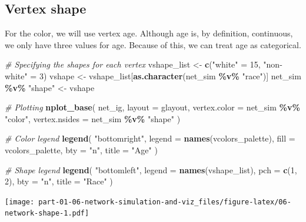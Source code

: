 \documentclass[
]{book}
\newenvironment{Shaded}{\begin{snugshade}}{\end{snugshade}}
\newcommand{\AttributeTok}[1]{\textcolor[rgb]{0.13,0.29,0.53}{#1}}
\newcommand{\CommentTok}[1]{\textcolor[rgb]{0.56,0.35,0.01}{\textit{#1}}}
\newcommand{\DecValTok}[1]{\textcolor[rgb]{0.00,0.00,0.81}{#1}}
\newcommand{\FunctionTok}[1]{\textcolor[rgb]{0.13,0.29,0.53}{\textbf{#1}}}
\newcommand{\NormalTok}[1]{#1}
\newcommand{\OtherTok}[1]{\textcolor[rgb]{0.56,0.35,0.01}{#1}}
\newcommand{\SpecialCharTok}[1]{\textcolor[rgb]{0.81,0.36,0.00}{\textbf{#1}}}
\newcommand{\StringTok}[1]{\textcolor[rgb]{0.31,0.60,0.02}{#1}}
\begin{document}
\hypertarget{vertex-shape}{%
\subsection{Vertex shape}\label{vertex-shape}}

For the color, we will use vertex age. Although age is, by definition, continuous,
we only have three values for age. Because of this, we can treat age as categorical.

\begin{Shaded}
\begin{Highlighting}[]
\CommentTok{\# Specifying the shapes for each vertex}
\NormalTok{vshape\_list }\OtherTok{\textless{}{-}} \FunctionTok{c}\NormalTok{(}\StringTok{"white"} \OtherTok{=} \DecValTok{15}\NormalTok{, }\StringTok{"non{-}white"} \OtherTok{=} \DecValTok{3}\NormalTok{)}
\NormalTok{vshape      }\OtherTok{\textless{}{-}}\NormalTok{ vshape\_list[}\FunctionTok{as.character}\NormalTok{(net\_sim }\SpecialCharTok{\%v\%} \StringTok{"race"}\NormalTok{)]}
\NormalTok{net\_sim }\SpecialCharTok{\%v\%} \StringTok{"shape"} \OtherTok{\textless{}{-}}\NormalTok{ vshape}

\CommentTok{\# Plotting}
\FunctionTok{nplot\_base}\NormalTok{(}
\NormalTok{  net\_ig,}
  \AttributeTok{layout =}\NormalTok{ glayout,}
  \AttributeTok{vertex.color =}\NormalTok{ net\_sim }\SpecialCharTok{\%v\%} \StringTok{"color"}\NormalTok{,}
  \AttributeTok{vertex.nsides =}\NormalTok{ net\_sim }\SpecialCharTok{\%v\%} \StringTok{"shape"}
\NormalTok{  )}

\CommentTok{\# Color legend}
\FunctionTok{legend}\NormalTok{(}
  \StringTok{"bottomright"}\NormalTok{,}
  \AttributeTok{legend =} \FunctionTok{names}\NormalTok{(vcolors\_palette),}
  \AttributeTok{fill   =}\NormalTok{ vcolors\_palette, }
  \AttributeTok{bty    =} \StringTok{"n"}\NormalTok{,}
  \AttributeTok{title  =} \StringTok{"Age"}
\NormalTok{  )}

\CommentTok{\# Shape legend}
\FunctionTok{legend}\NormalTok{(}
  \StringTok{"bottomleft"}\NormalTok{,}
  \AttributeTok{legend =} \FunctionTok{names}\NormalTok{(vshape\_list),}
  \AttributeTok{pch    =} \FunctionTok{c}\NormalTok{(}\DecValTok{1}\NormalTok{, }\DecValTok{2}\NormalTok{), }
  \AttributeTok{bty    =} \StringTok{"n"}\NormalTok{,}
  \AttributeTok{title  =} \StringTok{"Race"}
\NormalTok{  )}
\end{Highlighting}
\end{Shaded}

\texttt{[image: part-01-06-network-simulation-and-viz\_files/figure-latex/06-network-shape-1.pdf]}
\end{document}
